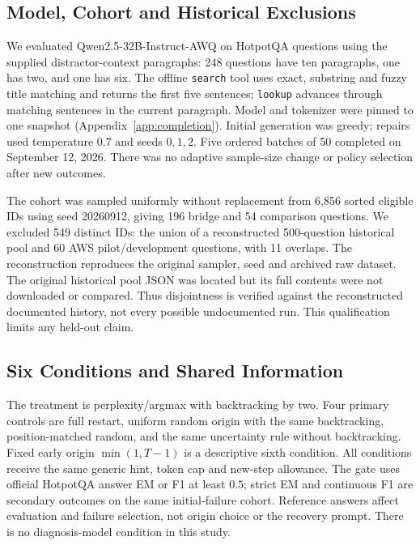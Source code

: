 \documentclass{article}
\begin{document}
\begin{table}[t]
\centering
\caption{Completed study coverage, excluding development and historical runs.
Repairs count unique executions; trial rows can reuse an execution across
conditions. Runtime questions overlap replication, but its 225 executions
are additional. Initial evaluations count model/question pairs.}
\label{tab:study_coverage}
\footnotesize

\end{table}

\subsection{Model, Cohort and Historical Exclusions}
We evaluated Qwen2.5-32B-Instruct-AWQ on \MainInitial{} HotpotQA questions
\citep{yang2018hotpotqa} using the supplied distractor-context paragraphs:
248 questions have ten paragraphs, one has two, and one has six.
The offline \texttt{search} tool uses exact, substring and fuzzy title
matching and returns the first five sentences; \texttt{lookup} advances
through matching sentences in the current paragraph. Model
and tokenizer were pinned to one snapshot (Appendix~\ref{app:completion}).
Initial generation was greedy; repairs used temperature $0.7$ and seeds
$0,1,2$. Five ordered batches of 50 completed on September 12, 2026. There
was no adaptive sample-size change or policy selection after new outcomes.

The cohort was sampled uniformly without replacement from 6,856 sorted
eligible IDs using seed 20260912, giving 196 bridge and 54 comparison
questions. We excluded 549 distinct IDs: the union of a reconstructed
500-question historical pool and 60 AWS pilot/development questions, with
11 overlaps. The reconstruction reproduces the original sampler, seed and
archived raw dataset. The original historical pool JSON was located but
its full contents were not downloaded or compared. Thus disjointness is
verified against the reconstructed documented history, not every possible
undocumented run. This qualification limits any held-out claim.

\subsection{Six Conditions and Shared Information}
The treatment is perplexity/argmax with backtracking by two. Four primary
controls are full restart, uniform random origin with the same backtracking,
position-matched random, and the same uncertainty rule without backtracking.
Fixed early origin $\min(1,T-1)$ is a descriptive sixth condition.
All conditions receive the same generic hint, token cap and new-step allowance.
The gate uses official HotpotQA answer EM or F1 at least $0.5$; strict EM
and continuous F1 are secondary outcomes on the same initial-failure cohort.
Reference answers affect evaluation and failure selection, not origin choice
or the recovery prompt. There is no diagnosis-model condition in this study.
\end{document}

